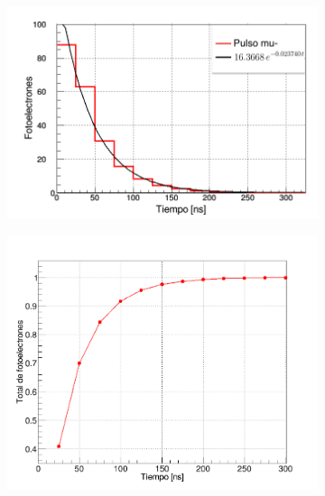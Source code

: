 \documentclass[12pt,oneside,openany,letter]{book}
\begin{document}
\begin{figure}[h!]
    \centering
    \begin{subfigure}{0.45\textwidth}
        \includegraphics[width=\textwidth]{images/vem_tiempo.png}
        \caption{}
        \label{vem_tiempo}
    \end{subfigure}
     \begin{subfigure}{0.4\textwidth}
        \includegraphics[width=\textwidth]{images/VEMcum.png}
        \caption{}
        \label{VEMcum}
    \end{subfigure}
    \begin{subfigure}{0.45\textwidth}

\end{subfigure}
\end{figure}
\end{document}
